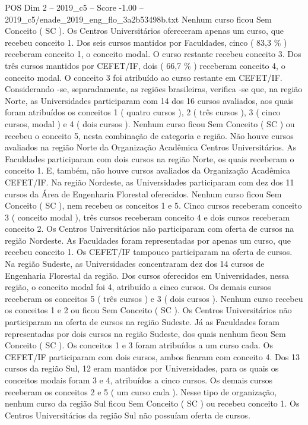 \begin{textsample}{POS Dim 2 – 2019\_c5 – Score -1.00 – 2019\_c5/enade\_2019\_eng\_flo\_3a2b53498b.txt}
Nenhum curso ficou Sem Conceito ( SC ).
Os Centros Universitários ofereceram apenas um curso, que recebeu conceito 1.
Dos seis cursos mantidos por Faculdades, cinco ( 83,3 \% ) receberam conceito 1, o conceito modal.
O curso restante recebeu conceito 3.
Dos três cursos mantidos por CEFET/IF, dois ( 66,7 \% ) receberam conceito 4, o conceito modal.
O conceito 3 foi atribuído ao curso restante em CEFET/IF.
Considerando -se, separadamente, as regiões brasileiras, verifica -se que, na região Norte, as Universidades participaram com 14 dos 16 cursos avaliados, aos quais foram atribuídos os conceitos 1 ( quatro cursos ), 2 ( três cursos ), 3 ( cinco cursos, modal ) e 4 ( dois cursos ).
Nenhum curso ficou Sem Conceito ( SC ) ou recebeu o conceito 5, nesta combinação de categoria e região.
Não houve cursos avaliados na região Norte da Organização Acadêmica Centros Universitários.
As Faculdades participaram com dois cursos na região Norte, os quais receberam o conceito 1.
E, também, não houve cursos avaliados da Organização Acadêmica CEFET/IF.
Na região Nordeste, as Universidades participaram com dez dos 11 cursos da Área de Engenharia Florestal oferecidos.
Nenhum curso ficou Sem Conceito ( SC ), nem recebeu os conceitos 1 e 5.
Cinco cursos receberam conceito 3 ( conceito modal ), três cursos receberam conceito 4 e dois cursos receberam conceito 2.
Os Centros Universitários não participaram com oferta de cursos na região Nordeste.
As Faculdades foram representadas por apenas um curso, que recebeu conceito 1.
Os CEFET/IF tampouco participaram na oferta de cursos.
Na região Sudeste, as Universidades concentraram dez dos 14 cursos de Engenharia Florestal da região.
Dos cursos oferecidos em Universidades, nessa região, o conceito modal foi 4, atribuído a cinco cursos.
Os demais cursos receberam os conceitos 5 ( três cursos ) e 3 ( dois cursos ).
Nenhum curso recebeu os conceitos 1 e 2 ou ficou Sem Conceito ( SC ).
Os Centros Universitários não participaram na oferta de cursos na região Sudeste.
Já as Faculdades foram representadas por dois cursos na região Sudeste, dos quais nenhum ficou Sem Conceito ( SC ).
Os conceitos 1 e 3 foram atribuídos a um curso cada.
Os CEFET/IF participaram com dois cursos, ambos ficaram com conceito 4.
Dos 13 cursos da região Sul, 12 eram mantidos por Universidades, para os quais os conceitos modais foram 3 e 4, atribuídos a cinco cursos.
Os demais cursos receberam os conceitos 2 e 5 ( um curso cada ).
Nesse tipo de organização, nenhum curso da região Sul ficou Sem Conceito ( SC ) ou recebeu conceito 1.
Os Centros Universitários da região Sul não possuíam oferta de cursos.

\end{textsample}
